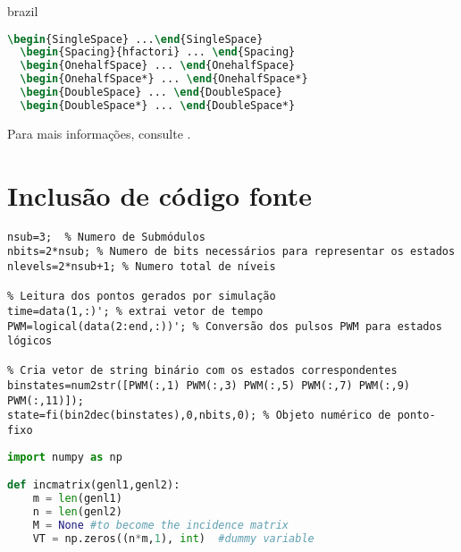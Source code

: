 \begin{otherlanguage*}{brazil}
\begin{lstlisting}[language=tex]
  \begin{SingleSpace} ...\end{SingleSpace}
  \begin{Spacing}{hfactori} ... \end{Spacing}
  \begin{OnehalfSpace} ... \end{OnehalfSpace}
  \begin{OnehalfSpace*} ... \end{OnehalfSpace*}
  \begin{DoubleSpace} ... \end{DoubleSpace}
  \begin{DoubleSpace*} ... \end{DoubleSpace*}
\end{lstlisting}

Para mais informações, consulte .

\section{Inclusão de código fonte}\label{sec-codeinsert}

\begin{lstlisting}[caption={Leitura dos dados simulados e conversão para estados topológicos.},label={lst:leituradadossim}]
% Pré definições iniciais
nsub=3;  % Numero de Submódulos
nbits=2*nsub; % Numero de bits necessários para representar os estados
nlevels=2*nsub+1; % Numero total de níveis

% Leitura dos pontos gerados por simulação
time=data(1,:)'; % extrai vetor de tempo
PWM=logical(data(2:end,:))'; % Conversão dos pulsos PWM para estados lógicos

% Cria vetor de string binário com os estados correspondentes
binstates=num2str([PWM(:,1) PWM(:,3) PWM(:,5) PWM(:,7) PWM(:,9) PWM(:,11)]);
state=fi(bin2dec(binstates),0,nbits,0); % Objeto numérico de ponto-fixo

\end{lstlisting}



\begin{lstlisting}[language=Python, caption=Python example]
import numpy as np

def incmatrix(genl1,genl2):
    m = len(genl1)
    n = len(genl2)
    M = None #to become the incidence matrix
    VT = np.zeros((n*m,1), int)  #dummy variable


\end{lstlisting}
\end{otherlanguage*}
